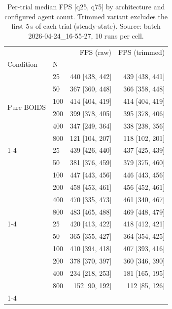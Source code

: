 \begin{table}[htbp]
  \centering
  \caption{Per-trial median FPS [q25, q75] by architecture and configured agent count. Trimmed variant excludes the first 5\,s of each trial (steady-state). Source: batch 2026-04-24_16-55-27, 10 runs per cell.}
  \label{tab:fps-by-architecture}
\begin{tabular}{llrr}
\toprule
 &  & FPS (raw) & FPS (trimmed) \\
Condition & N &  &  \\
\midrule
\multirow[t]{6}{*}{Pure BOIDS} & 25 & 440 [438, 442] & 439 [438, 441] \\
 & 50 & 367 [360, 448] & 366 [358, 448] \\
 & 100 & 414 [404, 419] & 414 [404, 419] \\
 & 200 & 399 [378, 405] & 395 [378, 406] \\
 & 400 & 347 [249, 364] & 338 [238, 356] \\
 & 800 & 121 [104, 207] & 118 [102, 201] \\
\cline{1-4}
\multirow[t]{6}{*}{BOIDS + GOAP Leader} & 25 & 439 [426, 440] & 437 [425, 439] \\
 & 50 & 381 [376, 459] & 379 [375, 460] \\
 & 100 & 447 [443, 456] & 446 [443, 456] \\
 & 200 & 458 [453, 461] & 456 [452, 461] \\
 & 400 & 470 [335, 473] & 461 [340, 467] \\
 & 800 & 483 [465, 488] & 469 [448, 479] \\
\cline{1-4}
\multirow[t]{6}{*}{GOAP + BOIDS Movement} & 25 & 420 [413, 422] & 418 [412, 421] \\
 & 50 & 365 [355, 427] & 364 [354, 425] \\
 & 100 & 410 [394, 418] & 407 [393, 416] \\
 & 200 & 378 [370, 397] & 360 [346, 390] \\
 & 400 & 234 [218, 253] & 181 [165, 195] \\
 & 800 & 152 [90, 192] & 112 [85, 126] \\
\cline{1-4}
\bottomrule
\end{tabular}
\end{table}
